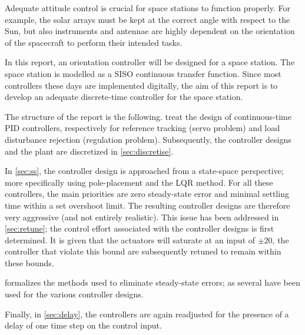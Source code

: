 Adequate attitude control is crucial for space stations to function properly. For example, the solar arrays must be kept at the correct angle with respect to the Sun, but also instruments and antennae are highly dependent on the orientation of the spacecraft to perform their intended tasks.

In this report, an orientation controller will be designed for a space station. The space station is modelled as a SISO continuous transfer function. Since most controllers these days are implemented digitally, the aim of this report is to develop an adequate discrete-time controller for the space station.

The structure of the report is the following.  treat the design of continuous-time PID controllers, respectively for reference tracking (servo problem) and load disturbance rejection (regulation problem). Subsequently, the controller designs and the plant are discretized in \cref{sec:discretise}. 

In \cref{sec:ss}, the controller design is approached from a state-space perspective; more specifically using pole-placement and the LQR method.
For all these controllers, the main priorities are zero steady-state error and minimal settling time within a set overshoot limit. The resulting controller designs are therefore very aggressive (and not entirely realistic). This issue has been addressed in \cref{sec:retune}; the control effort associated with the controller designs is first determined. It is given that the actuators will saturate at an input of $\pm20$, the controller that violate this bound are subsequently retuned to remain within these bounds.

 formalizes the methods used to eliminate steady-state errors; as several have been used for the various controller designs. 

Finally, in \cref{sec:delay}, the controllers are again readjusted for the presence of a delay of one time step on the control input.